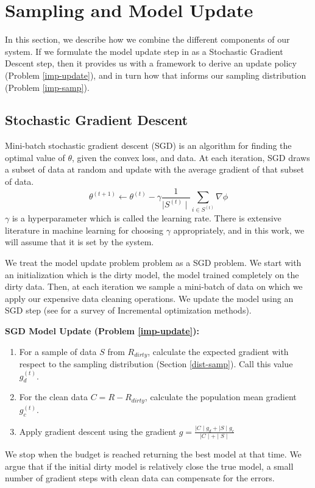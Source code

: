 \section{Sampling and Model Update}
In this section, we describe how we combine the different components
of our system.
If we formulate the model update step in \sys as a Stochastic Gradient Descent step, then 
it provides us with a framework to derive an update policy (Problem \ref{imp-update}), and in turn how that informs our sampling distribution (Problem \ref{imp-samp}).

\subsection{Stochastic Gradient Descent}
Mini-batch stochastic gradient descent (SGD) is an algorithm for finding the optimal value
of $\theta$, given the convex loss, and data.
At each iteration, SGD draws a subset of data at random and update with the average gradient of that subset of data.
 \[
 \theta^{(t+1)}\leftarrow\theta^{(t)}-\gamma\frac{1}{\mid S^{(t)}\mid}\sum_{i\in S^{(t)}}\nabla\phi
 \]
$\gamma$ is a hyperparameter which is called the learning rate.
There is extensive literature in machine learning for choosing $\gamma$ appropriately, and in this work, we will assume that it is set by the system.

We treat the model update problem problem as a SGD problem.
We start with an initialization which is the dirty model, the model trained completely on the dirty data.
Then, at each iteration we sample a mini-batch of data on which we apply our expensive data cleaning operations.
We update the model using an SGD step (see \cite{bertsekas2011incremental} for a survey of Incremental optimization methods).

\noindent\textbf{SGD Model Update (Problem \ref{imp-update}): }
\begin{enumerate}
\item For a sample of data $S$ from $R_{dirty}$, calculate the expected gradient with respect to the sampling distribution (Section \ref{dist-samp}). Call this value $g_d^{(t)}$.
\item For the clean data $C = R - R_{dirty}$, calculate the population mean gradient $g_c^{(t)}$.
\item Apply gradient descent using the gradient $g = \frac{\mid C \mid g_d + \mid S \mid g_c}{\mid C \mid  + \mid S \mid}$
\end{enumerate}

\noindent We stop when the budget is reached returning the best model at that time.
We argue that if the initial dirty model is relatively close the true model, a small number of gradient steps with clean data can compensate for the errors.

